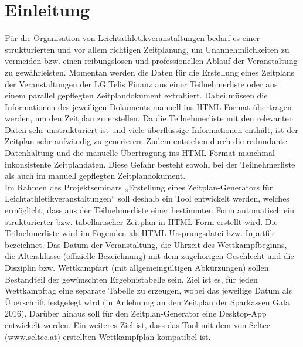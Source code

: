 
\chapter{Einleitung}
\label{chap:Einleitung}

Für die Organisation von Leichtathletikveranstaltungen bedarf es einer strukturierten und vor allem richtigen Zeitplanung, um Unannehmlichkeiten zu vermeiden bzw. einen reibungslosen und professionellen Ablauf der Veranstaltung zu gewährleisten. Momentan werden die Daten für die Erstellung eines Zeitplans der Veranstaltungen der LG Telis Finanz aus einer Teilnehmerliste oder aus einem parallel gepflegten Zeitplandokument extrahiert. Dabei müssen die Informationen des jeweiligen Dokuments manuell ins \ac{HTML}-Format übertragen werden, um den Zeitplan zu erstellen. Da die Teilnehmerliste mit den relevanten Daten sehr unstrukturiert ist und viele überflüssige Informationen enthält, ist der Zeitplan sehr aufwändig zu generieren. Zudem entstehen durch die redundante Datenhaltung und die manuelle Übertragung ins HTML-Format manchmal inkonsistente Zeitplandaten. Diese Gefahr besteht sowohl bei der Teilnehmerliste als auch im manuell gepflegten Zeitplandokument. \\
Im Rahmen des Projektseminars „Erstellung eines Zeitplan-Generators für Leichtathletikveranstaltungen“ soll deshalb ein Tool entwickelt werden, welches ermöglicht, dass aus der Teilnehmerliste einer bestimmten Form automatisch ein strukturierter bzw. tabellarischer Zeitplan in HTML-Form erstellt wird. Die Teilnehmerliste wird im Fogenden als \ac{HTML}-Ursprungsdatei bzw. Inputfile bezeichnet. Das Datum der Veranstaltung, die Uhrzeit des Wettkampfbeginns, die Altersklasse (offizielle Bezeichnung) mit dem zugehörigen Geschlecht und die Disziplin bzw. Wettkampfart (mit allgemeingültigen Abkürzungen) sollen Bestandteil der gewünschten Ergebnistabelle sein. Ziel ist es, für jeden Wettkampftag eine separate Tabelle zu erzeugen, wobei das jeweilige Datum als Überschrift festgelegt wird (in Anlehnung an den Zeitplan der Sparkassen Gala 2016)\cite{gala}.
Darüber hinaus soll für den Zeitplan-Generator eine Desktop-App entwickelt werden. Ein weiteres Ziel ist, dass das Tool mit dem von Seltec (www.seltec.at) erstellten Wettkampfplan kompatibel ist.\\

